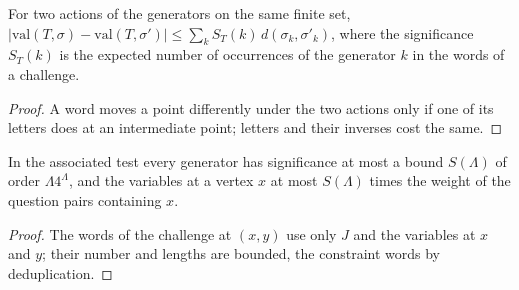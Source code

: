 \begin{lemma}
\label{lem:test-robust}
\leanok
For two actions of the generators on the same finite set,
$|\mathrm{val}(T, \sigma) - \mathrm{val}(T, \sigma')| \leq \sum_k S_T(k)\, d(\sigma_k,
\sigma'_k)$, where the significance $S_T(k)$ is the expected number of occurrences of the
generator $k$ in the words of a challenge.
\end{lemma}

\begin{proof}
\leanok
A word moves a point differently under the two actions only if one of its letters does at an
intermediate point; letters and their inverses cost the same.
\end{proof}

\begin{lemma}
\label{lem:assoc-significance}
\leanok
In the associated test every generator has significance at most a bound $S(\Lambda)$ of order
$\Lambda 4^{\Lambda}$, and the variables at a vertex $x$ at most $S(\Lambda)$ times the weight of
the question pairs containing $x$.
\end{lemma}

\begin{proof}
\leanok
The words of the challenge at $(x, y)$ use only $J$ and the variables at $x$ and $y$; their
number and lengths are bounded, the constraint words by deduplication.
\end{proof}

